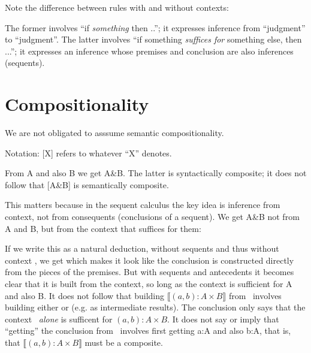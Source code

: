 \documentclass{article}
\begin{document}
Note the difference between rules with and without contexts:



The former involves ``if \textit{something} then ..''; it expresses
inference from ``judgment'' to ``judgment''. The latter involves ``if
something \textit{suffices for} something else, then ...''; it
expresses an inference whose premises and conclusion are also
inferences (sequents).

\section{Compositionality}

We are not obligated to asssume semantic compositionality.

Notation:  [X] refers to whatever ``X'' denotes.

From A and also B we get A\&B. The latter is syntactically composite;
it does not follow that [A\&B] is semantically composite.

This matters because in the sequent calculus the key idea is inference
from context, not from consequents (conclusions of a sequent). We get
A\&B not from A and B, but from the context that suffices for them:



If we write this as a natural deduction, without sequents and thus
without context \ContextG , we get
which
makes it look like the conclusion is constructed directly from the
pieces of the premises. But with sequents and antecedents it becomes
clear that it is built from the context, so long as the context is
sufficient for A and also B. It does not follow that building
\(\llbracket (a,b):A\times B\rrbracket\) from \ContextG\ involves
building either  or  (e.g. as intermediate
results). The conclusion only says that the context
\ContextG\ \textit{alone} is sufficent for \((a,b):A\times B\). It
does not say or imply that ``getting'' the conclusion from
\ContextG\ involves first getting a:A and also b:A, that is, that
\(\llbracket (a,b):A\times B\rrbracket\) must be a composite.
\end{document}
